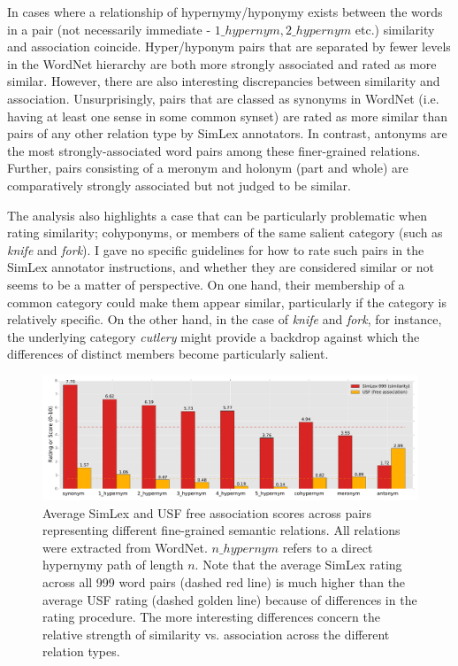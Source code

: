 In cases where a relationship of hypernymy/hyponymy exists between the words in a pair (not necessarily immediate - \(1\_hypernym, 2\_hypernym\) etc.) similarity and association coincide. Hyper/hyponym pairs that are separated by fewer levels in the WordNet hierarchy are both more strongly associated and rated as more similar. However, there are also interesting discrepancies between similarity and association. Unsurprisingly, pairs that are classed as synonyms in WordNet (i.e. having at least one sense in some common synset) are rated as more similar than pairs of any other relation type by SimLex annotators. In contrast, antonyms are the most strongly-associated word pairs among these finer-grained relations. Further, pairs consisting of a meronym and holonym (part and whole) are comparatively strongly associated but not judged to be similar. 

The analysis also highlights a case that can be particularly problematic when rating similarity;  cohyponyms, or members of the same salient category (such as \emph{knife} and \emph{fork}). I gave no specific guidelines for how to rate such pairs in the SimLex annotator instructions, and whether they are considered similar or not seems to be a matter of perspective. On one hand, their membership of a common category could make them appear similar, particularly if the category is relatively specific. On the other hand, in the case of \emph{knife} and \emph{fork}, for instance, the underlying category \emph{cutlery} might provide a backdrop against which the differences of distinct members become particularly salient. 

\begin{figure}[ht]  \includegraphics[width =\textwidth]{Chapter_2/simlex_relations_CL}  \caption{\label{fig6} Average SimLex and USF free association scores across pairs representing different fine-grained semantic relations. All relations were extracted from WordNet. \(n\_hypernym\) refers to a direct hypernymy path of length \(n\). Note that the average SimLex rating across all 999 word pairs (dashed red line) is much higher than the average USF rating (dashed golden line) because of differences in the rating procedure. The more interesting differences concern the relative strength of similarity vs. association across the different relation types.}\end{figure}  

